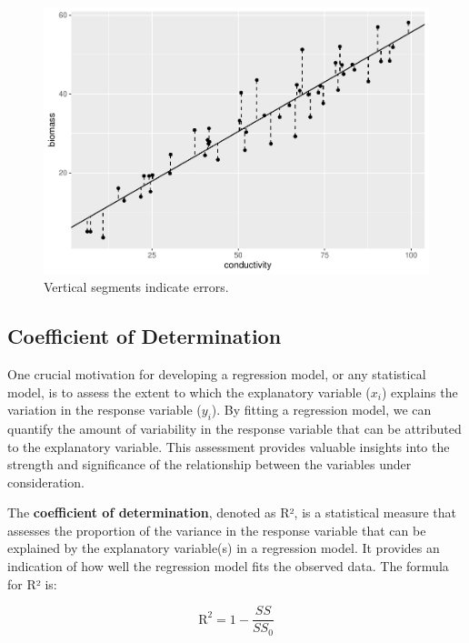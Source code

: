 \documentclass[
]{book}
\begin{document}
\begin{figure}

{\centering \includegraphics{biostats_files/figure-latex/geom-errors-1} 

}

\caption{Vertical segments indicate errors.}\label{fig:geom-errors}
\end{figure}

\hypertarget{coefficient-of-determination}{%
\subsection{Coefficient of Determination}\label{coefficient-of-determination}}

One crucial motivation for developing a regression model, or any statistical model, is to assess the extent to which the explanatory variable (\(x_i\)) explains the variation in the response variable (\(y_i\)). By fitting a regression model, we can quantify the amount of variability in the response variable that can be attributed to the explanatory variable. This assessment provides valuable insights into the strength and significance of the relationship between the variables under consideration.

The \textbf{coefficient of determination}, denoted as R², is a statistical measure that assesses the proportion of the variance in the response variable that can be explained by the explanatory variable(s) in a regression model. It provides an indication of how well the regression model fits the observed data. The formula for R² is:

\[
\text{R}^2 = 1 - \frac{SS}{SS_0}
\]
\end{document}
